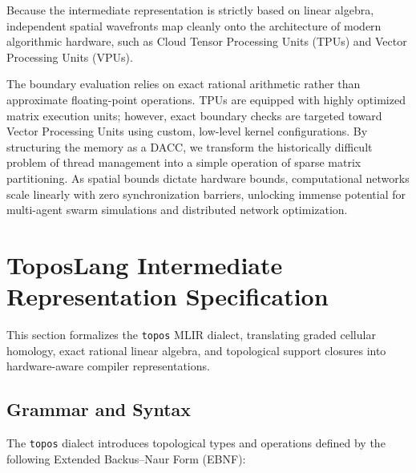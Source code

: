 \documentclass[manuscript, nonacm, review=false]{acmart}
\theoremstyle{definition}
\theoremstyle{plain}
\begin{document}
Because the intermediate representation is strictly based on linear algebra, independent spatial wavefronts map cleanly onto the architecture of modern algorithmic hardware, such as Cloud Tensor Processing Units (TPUs) and Vector Processing Units (VPUs).

The boundary evaluation relies on exact rational arithmetic rather than approximate floating-point operations. TPUs are equipped with highly optimized matrix execution units; however, exact boundary checks are targeted toward Vector Processing Units using custom, low-level kernel configurations. By structuring the memory as a DACC, we transform the historically difficult problem of thread management into a simple operation of sparse matrix partitioning. As spatial bounds dictate hardware bounds, computational networks scale linearly with zero synchronization barriers, unlocking immense potential for multi-agent swarm simulations and distributed network optimization.



\section{ToposLang Intermediate Representation Specification}
\label{sec:ir_spec}

This section formalizes the \texttt{topos} MLIR dialect, translating graded cellular homology, exact rational linear algebra, and topological support closures into hardware-aware compiler representations.

\subsection{Grammar and Syntax}
\label{subsec:ir_grammar}

The \texttt{topos} dialect introduces topological types and operations defined by the following Extended Backus--Naur Form (EBNF):
\end{document}
